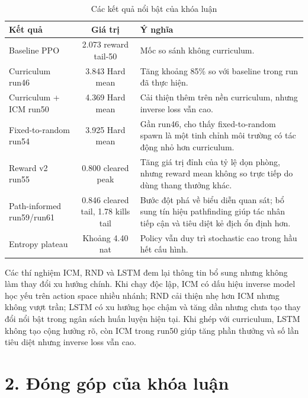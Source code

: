 \begin{table}[H]
    \centering
    \small
    \caption{Các kết quả nổi bật của khóa luận}
    \label{tab:conclusion_best_results}
    \begin{tabular}{|p{4.5cm}|c|p{7cm}|}
        \hline
        \textbf{Kết quả} & \textbf{Giá trị} & \textbf{Ý nghĩa} \\
        \hline
        Baseline PPO & 2.073 reward tail-50 & Mốc so sánh không curriculum. \\
        \hline
        Curriculum run46 & 3.843 Hard mean & Tăng khoảng 85\% so với baseline trong run đã thực hiện. \\
        \hline
        Curriculum + ICM run50 & 4.369 Hard mean & Cải thiện thêm trên nền curriculum, nhưng inverse loss vẫn cao. \\
        \hline
        Fixed-to-random run54 & 3.925 Hard mean & Gần run46, cho thấy fixed-to-random spawn là một tinh chỉnh môi trường có tác động nhỏ hơn curriculum. \\
        \hline
        Reward v2 run55 & 0.800 cleared peak & Tăng giá trị đỉnh của tỷ lệ dọn phòng, nhưng reward mean không so trực tiếp do dùng thang thưởng khác. \\
        \hline
        Path-informed run59/run61 & 0.846 cleared tail, 1.78 kills tail & Bước đột phá về biểu diễn quan sát; bổ sung tín hiệu pathfinding giúp tác nhân tiếp cận và tiêu diệt kẻ địch ổn định hơn. \\
        \hline
        Entropy plateau & Khoảng 4.40 nat & Policy vẫn duy trì stochastic cao trong hầu hết cấu hình. \\
        \hline
    \end{tabular}
\end{table}

Các thí nghiệm ICM, RND và LSTM đem lại thông tin bổ sung nhưng không làm thay đổi xu hướng chính. Khi chạy độc lập, ICM có dấu hiệu inverse model học yếu trên action space nhiều nhánh; RND cải thiện nhẹ hơn ICM nhưng không vượt trần; LSTM có xu hướng học chậm và tăng dần nhưng chưa tạo thay đổi nổi bật trong ngân sách huấn luyện hiện tại. Khi ghép với curriculum, LSTM không tạo cộng hưởng rõ, còn ICM trong run50 giúp tăng phần thưởng và số lần tiêu diệt nhưng inverse loss vẫn cao.

\section*{2. Đóng góp của khóa luận}

